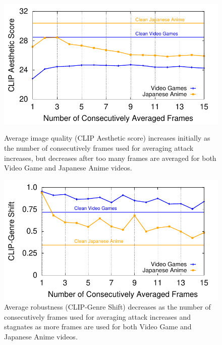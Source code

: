 \begin{figure}[t]
  \centering
  \begin{minipage}[t]{0.32\textwidth}
  \centering
  \includegraphics[width=0.9\columnwidth]{plots/avg-tests/avg-aesthetic-eps-converted-to.pdf}
  \vspace{-0.1in}
  \caption{Average image quality (CLIP Aesthetic score) increases initially as the number of consecutively frames used for averaging attack increases, but decreases after too many frames are averaged for both Video Game and Japanese Anime videos.}
  \label{fig:aesthetic-caf}
  \end{minipage}
  \hfill
  \centering
  \begin{minipage}[t]{0.32\textwidth}
  \centering
  \includegraphics[width=0.9\columnwidth]{plots/avg-tests/avg-clip-shift-eps-converted-to.pdf}
  \vspace{-0.1in}
  \caption{Average robustness (CLIP-Genre Shift) decreases as the number of consecutively frames used for averaging attack increases and stagnates as more frames are used for both Video Game and Japanese Anime videos.}
  \label{fig:clip-shift-caf}
  \end{minipage}
    \hfill
    \centering
  \begin{minipage}[t]{0.32\textwidth}

\end{minipage}
\end{figure}
